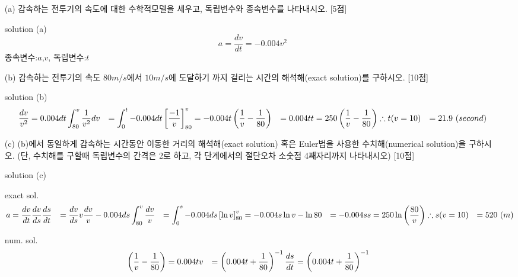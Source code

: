 \documentclass[a4,10pt]{article}
\numberwithin{algorithm}{section}
\theoremstyle{examplestyle}
\let\\\tabularnewline
\let\\\tabularnewline
\begin{document}
\begin{itemize}
\item[(a)] 감속하는 전투기의 속도에 대한 수학적모델을 세우고, 독립변수와 종속변수를 나타내시오. [5점]
\item[solution (a)]
\begin{displaymath}
a=\frac{dv}{dt}=-0.004v^2
\end{displaymath}
종속변수:$a$,$v$, 독립변수:$t$
\item[(b)] 감속하는 전투기의 속도 $80m/s$에서 $10m/s$에 도달하기 까지 걸리는 시간의 해석해(exact solution)를 구하시오. [10점]
\item[solution (b)]
\begin{align*}
\frac{dv}{v^2}&=0.004dt\\
\int_{80}^{v}\frac{1}{v^2}dv&=\int_{0}^{t}-0.004dt\\
\left[\frac{-1}{v}\right]_{80}^{v}&=-0.004t\\
\left(\frac{1}{v}-\frac{1}{80}\right)&=0.004t\\
t&=250\left(\frac{1}{v}-\frac{1}{80}\right)\\
\therefore t(v=10)&=21.9~(second)
\end{align*}
\item[(c)] (b)에서 동일하게 감속하는 시간동안 이동한 거리의 해석해(exact solution) 혹은 Euler법을 사용한 수치해(numerical solution)을 구하시오. (단, 수치해를 구할때 독립변수의 간격은 2로 하고, 각 단계에서의 절단오차 소숫점 4째자리까지 나타내시오) [10점]
\item[solution (c)]
\item[exact sol.]
\begin{align*}
a&=\frac{dv}{dt}\\
\frac{dv}{ds}\frac{ds}{dt}&=\frac{dv}{ds}v\\
\frac{dv}{v}&-0.004ds\\
\int_{80}^{v}\frac{dv}{v}&=\int_{0}^{s}-0.004ds\\
\left[\ln v\right]_{80}^{v}&=-0.004s\\
\ln v -\ln 80&=-0.004s\\
s&=250\ln\left(\frac{80}{v}\right)\\
\therefore s(v=10)&=520~(m)
\end{align*}
\item[num. sol.]
\begin{align*}
\left(\frac{1}{v}-\frac{1}{80}\right)&=0.004t\\
v&=\left(0.004t+\frac{1}{80}\right)^{-1}\\
\frac{ds}{dt}&=\left(0.004t+\frac{1}{80}\right)^{-1}\\

\end{align*}
\end{itemize}
\end{document}
